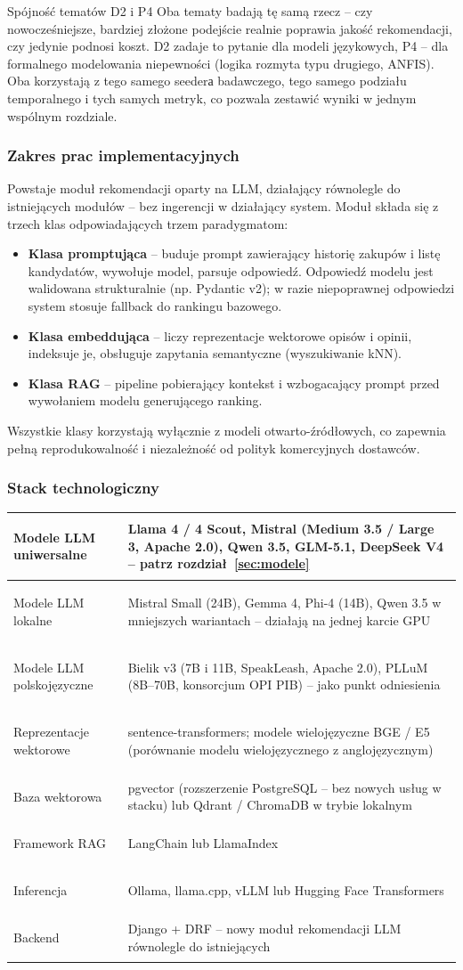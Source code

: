 \documentclass[12pt,a4paper]{article}
\newenvironment{stacktab}{%
    \arrayrulecolor{border}%
    \begin{tabular}{|>{\columncolor{lightbg}\bfseries\color{primary}\raggedright\arraybackslash}p{4.4cm}|>{\raggedright\arraybackslash}p{11.6cm}|}
    \hline
}{%
    \end{tabular}%
    \arrayrulecolor{black}%
}
\newcommand{\stackrow}[2]{#1 & #2 \\ \hline}
\newcommand{\topicsection}[1]{\subsubsection*{#1}}
\begin{document}
\begin{infobox}{Spójność tematów D2 i P4}
Oba tematy badają tę samą rzecz -- czy nowocześniejsze, bardziej złożone podejście realnie poprawia jakość rekomendacji, czy jedynie podnosi koszt. D2 zadaje to pytanie dla modeli językowych, P4 -- dla formalnego modelowania niepewności (logika rozmyta typu drugiego, ANFIS). Oba korzystają z tego samego seederа badawczego, tego samego podziału temporalnego i tych samych metryk, co pozwala zestawić wyniki w jednym wspólnym rozdziale.
\end{infobox}

\topicsection{Zakres prac implementacyjnych}
Powstaje moduł rekomendacji oparty na LLM, działający równolegle do istniejących modułów -- bez ingerencji w działający system. Moduł składa się z trzech klas odpowiadających trzem paradygmatom:

\begin{itemize}
\item \textbf{Klasa promptująca} -- buduje prompt zawierający historię zakupów i listę kandydatów, wywołuje model, parsuje odpowiedź. Odpowiedź modelu jest walidowana strukturalnie (np. Pydantic v2); w razie niepoprawnej odpowiedzi system stosuje fallback do rankingu bazowego.
\item \textbf{Klasa embeddująca} -- liczy reprezentacje wektorowe opisów i opinii, indeksuje je, obsługuje zapytania semantyczne (wyszukiwanie kNN).
\item \textbf{Klasa RAG} -- pipeline pobierający kontekst i wzbogacający prompt przed wywołaniem modelu generującego ranking.
\end{itemize}

Wszystkie klasy korzystają wyłącznie z modeli otwarto-źródłowych, co zapewnia pełną reprodukowalność i niezależność od polityk komercyjnych dostawców.

\topicsection{Stack technologiczny}
\begin{stacktab}
\stackrow{Modele LLM uniwersalne}{Llama 4 / 4 Scout, Mistral (Medium 3.5 / Large 3, Apache 2.0), Qwen 3.5, GLM-5.1, DeepSeek V4 -- patrz rozdział~\ref{sec:modele}}
\stackrow{Modele LLM lokalne}{Mistral Small (24B), Gemma 4, Phi-4 (14B), Qwen 3.5 w mniejszych wariantach -- działają na jednej karcie GPU}
\stackrow{Modele LLM polskojęzyczne}{Bielik v3 (7B i 11B, SpeakLeash, Apache 2.0), PLLuM (8B--70B, konsorcjum OPI PIB) -- jako punkt odniesienia}
\stackrow{Reprezentacje wektorowe}{sentence-transformers; modele wielojęzyczne BGE / E5 (porównanie modelu wielojęzycznego z anglojęzycznym)}
\stackrow{Baza wektorowa}{pgvector (rozszerzenie PostgreSQL -- bez nowych usług w stacku) lub Qdrant / ChromaDB w trybie lokalnym}
\stackrow{Framework RAG}{LangChain lub LlamaIndex}
\stackrow{Inferencja}{Ollama, llama.cpp, vLLM lub Hugging Face Transformers}
\stackrow{Backend}{Django + DRF -- nowy moduł rekomendacji LLM równolegle do istniejących}
\end{stacktab}
\end{document}
